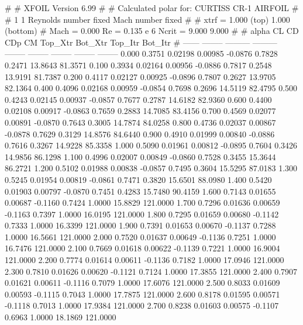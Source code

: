 #  
#       XFOIL         Version 6.99
#  
# Calculated polar for: CURTISS CR-1 AIRFOIL                            
#  
# 1 1 Reynolds number fixed          Mach number fixed         
#  
# xtrf =   1.000 (top)        1.000 (bottom)  
# Mach =   0.000     Re =     0.135 e 6     Ncrit =   9.000  9.000
#  
#   alpha    CL        CD       CDp       CM     Top_Xtr  Bot_Xtr  Top_Itr  Bot_Itr
#  ------ -------- --------- --------- -------- -------- -------- -------- --------
   0.000   0.3751   0.02198   0.00985  -0.0876   0.7828   0.2471  13.8643  81.3571
   0.100   0.3934   0.02164   0.00956  -0.0886   0.7817   0.2548  13.9191  81.7387
   0.200   0.4117   0.02127   0.00925  -0.0896   0.7807   0.2627  13.9705  82.1364
   0.400   0.4096   0.02168   0.00959  -0.0854   0.7698   0.2696  14.5119  82.4795
   0.500   0.4243   0.02145   0.00937  -0.0857   0.7677   0.2787  14.6182  82.9360
   0.600   0.4400   0.02108   0.00917  -0.0863   0.7659   0.2883  14.7085  83.4156
   0.700   0.4569   0.02077   0.00891  -0.0870   0.7643   0.3005  14.7874  84.0258
   0.800   0.4736   0.02037   0.00867  -0.0878   0.7629   0.3129  14.8576  84.6440
   0.900   0.4910   0.01999   0.00840  -0.0886   0.7616   0.3267  14.9228  85.3358
   1.000   0.5090   0.01961   0.00812  -0.0895   0.7604   0.3426  14.9856  86.1298
   1.100   0.4996   0.02007   0.00849  -0.0860   0.7528   0.3455  15.3644  86.2721
   1.200   0.5102   0.01988   0.00838  -0.0857   0.7495   0.3604  15.5295  87.0183
   1.300   0.5245   0.01954   0.00819  -0.0861   0.7471   0.3820  15.6501  88.0980
   1.400   0.5420   0.01903   0.00797  -0.0870   0.7451   0.4283  15.7480  90.4159
   1.600   0.7143   0.01655   0.00687  -0.1160   0.7424   1.0000  15.8829 121.0000
   1.700   0.7296   0.01636   0.00659  -0.1163   0.7397   1.0000  16.0195 121.0000
   1.800   0.7295   0.01659   0.00680  -0.1142   0.7333   1.0000  16.3399 121.0000
   1.900   0.7391   0.01653   0.00670  -0.1137   0.7288   1.0000  16.5661 121.0000
   2.000   0.7520   0.01637   0.00649  -0.1136   0.7251   1.0000  16.7476 121.0000
   2.100   0.7669   0.01618   0.00622  -0.1139   0.7221   1.0000  16.9004 121.0000
   2.200   0.7774   0.01614   0.00611  -0.1136   0.7182   1.0000  17.0946 121.0000
   2.300   0.7810   0.01626   0.00620  -0.1121   0.7124   1.0000  17.3855 121.0000
   2.400   0.7907   0.01621   0.00611  -0.1116   0.7079   1.0000  17.6076 121.0000
   2.500   0.8033   0.01609   0.00593  -0.1115   0.7043   1.0000  17.7875 121.0000
   2.600   0.8178   0.01595   0.00571  -0.1118   0.7013   1.0000  17.9384 121.0000
   2.700   0.8238   0.01603   0.00575  -0.1107   0.6963   1.0000  18.1869 121.0000
